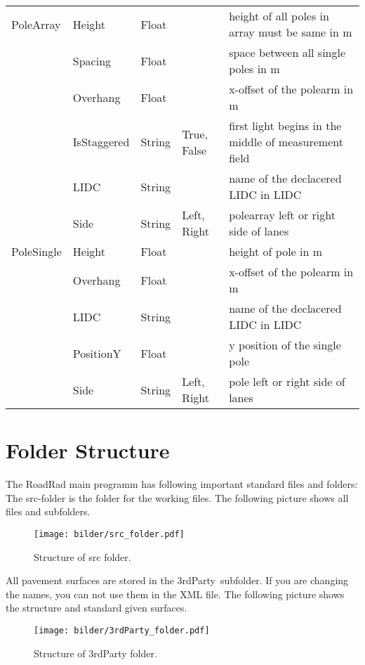 \documentclass[10pt,a4paper]{report}
\begin{document}
\begin{landscape}
\begin{longtable}{lllp{4cm}p{6cm}}
	\rowcolor{hellgrau}
		PoleArray & Height & Float & & height of all poles in array must be same in m \\\rowcolor{hellgrau}
		 & Spacing & Float & & space between all single poles in m \\\rowcolor{hellgrau}
		 & Overhang & Float & & x-offset of the polearm in m \\\rowcolor{hellgrau}
		 & IsStaggered & String & True, False & first light begins in the middle of measurement field \\\rowcolor{hellgrau}
		 & LIDC & String & & name of the declacered LIDC in LIDC \\\rowcolor{hellgrau}
		 & Side & String & Left, Right & polearray left or right side of lanes \\
	
		PoleSingle & Height & Float & & height of pole in m \\
		 & Overhang & Float & & x-offset of the polearm in m \\
		 & LIDC & String & & name of the declacered LIDC in LIDC \\
		 & PositionY & Float & & y position of the single pole \\ 
		 & Side & String & Left, Right & pole left or right side of lanes \\
	
	\end{longtable} 

\end{landscape}

\chapter{Folder Structure}
\label{chap:folder_struc}

The RoadRad main programm has following important standard files and folders:
The src-folder is the folder for the working files. The following picture shows all files and subfolders.
\begin{figure}[H]
\texttt{[image: bilder/src\_folder.pdf]} 
\caption{Structure of src folder.}
\end{figure}

All pavement surfaces are stored in the \glqq 3rdParty\grqq\ subfolder. If you are changing the names, you can not use them in the XML file. The following picture shows the structure and standard given surfaces.
\begin{figure}[H]
\texttt{[image: bilder/3rdParty\_folder.pdf]} 
\caption{Structure of 3rdParty folder.}
\end{figure}
\end{document}
